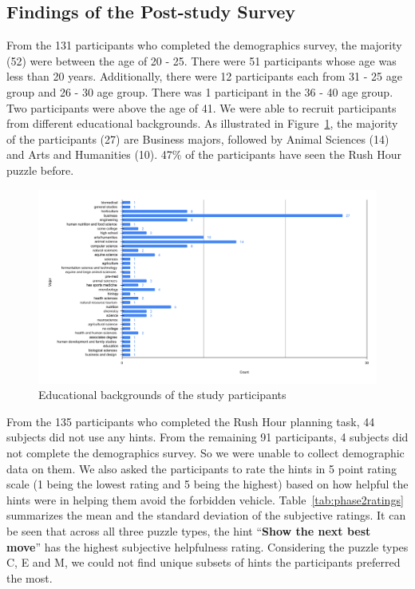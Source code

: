 \subsection{Findings of the Post-study Survey}
From the 131 participants who completed the demographics survey, the majority (52) were between the age of 20 - 25. 
There were 51 participants whose age was less than 20 years. 
Additionally, there were 12 participants each from 31 - 25 age group and 26 - 30 age group. 
There was 1 participant in the 36 - 40 age group. 
Two participants were above the age of 41.
We were able to recruit participants from different educational backgrounds.
As illustrated in Figure~\ref{fig:demophase2}, the majority of the participants (27) are Business majors, followed by Animal Sciences (14) and Arts and Humanities (10).
47\% of the participants have seen the Rush Hour puzzle before.
\begin{figure}[tpb]
  \centering
  \includegraphics[height=0.6\columnwidth]{img/demophase2.pdf}
  \caption{Educational backgrounds of the study participants}
  \label{fig:demophase2}
\end{figure}

From the 135 participants who completed the Rush Hour planning task, 44 subjects did not use any hints. 
From the remaining 91 participants, 4 subjects did not complete the demographics survey.
So we were unable to collect demographic data on them.
We also asked the participants to rate the hints in 5 point rating scale (1 being the lowest rating and 5 being the highest) based on how helpful the hints were in helping them avoid the forbidden vehicle.
Table~\ref{tab:phase2ratings} summarizes the mean and the standard deviation of the subjective ratings.
It can be seen that across all three puzzle types,  the hint ``\textbf{Show the next best move}'' has the highest subjective helpfulness rating.
Considering the puzzle types C, E and M, we could not find unique subsets of hints the participants preferred the most.

